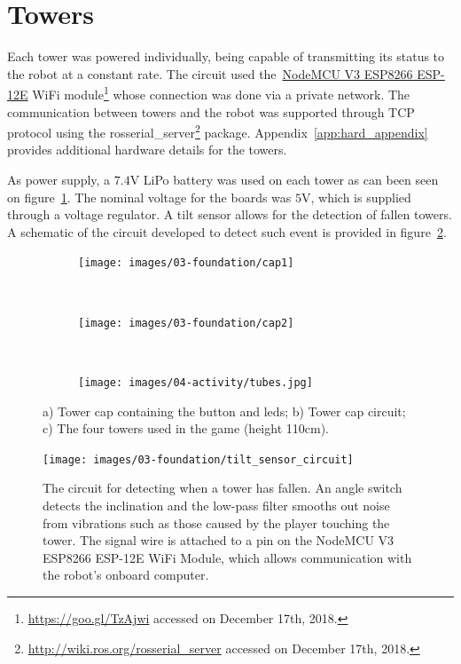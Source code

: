 \section{Towers}\label{sec:towers}
Each tower was powered individually, being capable of transmitting its status to the robot at a constant rate. The circuit used the~\href{https://einstronic.com/wp-content/uploads/2017/06/NodeMCU-ESP8266-ESP-12E-Catalogue.pdf}{NodeMCU V3 ESP8266 ESP-12E} WiFi module\footnote{\url{https://goo.gl/TzAjwi} accessed on December 17th, 2018.} whose connection was done via a private network. The communication between towers and the robot was supported through TCP protocol using the rosserial\_server\footnote{\url{http://wiki.ros.org/rosserial_server} accessed on December 17th, 2018.} package. Appendix~\ref{app:hard_appendix} provides additional hardware details for the towers. 

As power supply, a $7.4$V LiPo battery was used on each tower as can been seen on figure~\ref{fig:tower_caps}. The nominal voltage for the boards was $5$V, which is supplied through a voltage regulator. A tilt sensor allows for the detection of fallen towers. A schematic of the circuit developed to detect such event is provided in figure~\ref{fig:tilt_circuit}.

\begin{figure}[H]
  \centering
  \begin{subfigure}[t]{0.33\textwidth}
  	\centering
    \texttt{[image: images/03-foundation/cap1]}
	\caption{}
  \end{subfigure}
  ~ 
  \begin{subfigure}[t]{0.33\textwidth}
  	\centering
    \texttt{[image: images/03-foundation/cap2]}
	\caption{}
  \end{subfigure}
  ~
   \begin{subfigure}[b]{0.33\textwidth}
	  \centering
      \texttt{[image: images/04-activity/tubes.jpg]}
      \caption{}
    \end{subfigure}
  \caption{a) Tower cap containing the button and \gls{led}s; b) Tower cap circuit; c) The four towers used in the game (height 110cm).}
  \label{fig:tower_caps}
\end{figure}


\begin{figure}[H]
	\centering
		\texttt{[image: images/03-foundation/tilt\_sensor\_circuit]}
	\caption{The circuit for detecting when a tower has fallen. An angle switch detects the inclination and the low-pass filter smooths out noise from vibrations such as those caused by the player touching the tower. The signal wire is attached to a pin on the NodeMCU V3 ESP8266 ESP-12E WiFi Module, which allows communication with the robot's onboard computer.}
    \label{fig:tilt_circuit} 
\end{figure}

